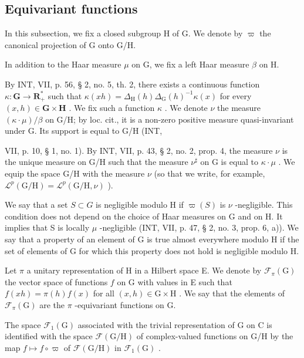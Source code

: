 \subsection{Equivariant functions}

In this subsection, we fix a closed subgroup H of G. We denote by \(\varpi\) the canonical projection of G onto G/H.

In addition to the Haar measure \(\mu\) on G, we fix a left Haar measure \(\beta\) on H.

By INT, VII, p. 56, § 2, no. 5, th. 2, there exists a continuous function \(\kappa\colon\mathbf{G}\to\mathbf{R}_{+}^{*}\) such that \(\kappa(xh)=\Delta_{\mathrm{H}}(h)\Delta_{\mathrm{G}}(h)^{-1}\kappa(x)\) for every \((x,h)\in\mathbf{G}\times\mathbf{H}\) . We fix such a function \(\kappa\) . We denote \(\nu\) the measure \((\kappa\cdot\mu)/\beta\) on G/H; by loc. cit., it is a non-zero positive measure quasi-invariant under G. Its support is equal to G/H (INT,

VII, p. 10, § 1, no. 1). By INT, VII, p. 43, § 2, no. 2, prop. 4, the measure \(\nu\) is the unique measure on G/H such that the measure \(\nu^{\sharp}\) on G is equal to \(\kappa \cdot \mu\) . We equip the space G/H with the measure \(\nu\) (so that we write, for example, \(\mathcal{L}^{p}(\mathrm{G / H}) = \mathcal{L}^{p}(\mathrm{G / H},\nu)\) ).

 We say that a set \(S \subset G\) is negligible modulo H if \(\varpi(S)\) is \(\nu\) -negligible. This condition does not depend on the choice of Haar measures on G and on H. It implies that S is locally \(\mu\) -negligible (INT, VII, p. 47, § 2, no. 3, prop. 6, a)). We say that a property of an element of G is true almost everywhere modulo H if the set of elements of G for which this property does not hold is negligible modulo H.

Let \(\pi\) a unitary representation of H in a Hilbert space E. We denote by \(\mathcal{F}_{\pi}(\mathrm{G})\) the vector space of functions \(f\) on G with values in E such that \(f(xh) = \pi(h)f(x)\) for all \((x,h) \in \mathrm{G} \times \mathrm{H}\) . We say that the elements of \(\mathcal{F}_{\pi}(\mathrm{G})\) are the \(\pi\) -equivariant functions on G.

The space \(\mathcal{F}_{1}(\mathrm{G})\) associated with the trivial representation of G on C is identified with the space \(\mathcal{F}(\mathrm{G / H})\) of complex-valued functions on G/H by the map \(f\mapsto f\circ \varpi\) of \(\mathcal{F}(\mathrm{G / H})\) in \(\mathcal{F}_1(\mathrm{G})\) .

